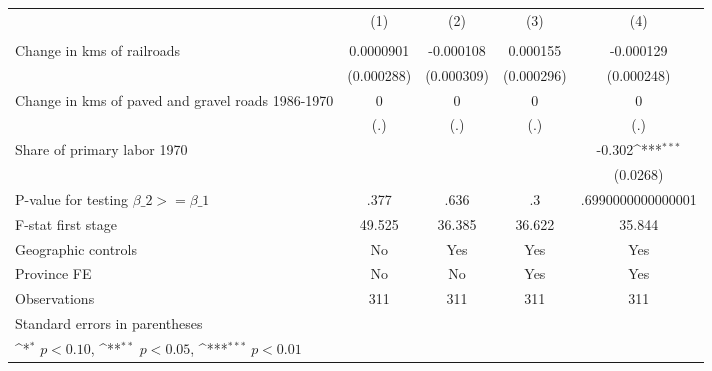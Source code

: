 {
\def\sym#1{\ifmmode^{#1}\else\(^{#1}\)\fi}
\begin{tabular}{l*{4}{c}}
\hline\hline
                &\multicolumn{1}{c}{(1)}&\multicolumn{1}{c}{(2)}&\multicolumn{1}{c}{(3)}&\multicolumn{1}{c}{(4)}\\
                &\multicolumn{1}{c}{}&\multicolumn{1}{c}{}&\multicolumn{1}{c}{}&\multicolumn{1}{c}{}\\
\hline
Change in kms of railroads&0.0000901         &-0.000108         & 0.000155         &-0.000129         \\
                &(0.000288)         &(0.000309)         &(0.000296)         &(0.000248)         \\
[1em]
Change in kms of paved and gravel roads 1986-1970&        0         &        0         &        0         &        0         \\
                &      (.)         &      (.)         &      (.)         &      (.)         \\
[1em]
Share of primary labor 1970&                  &                  &                  &   -0.302\sym{***}\\
                &                  &                  &                  & (0.0268)         \\
\hline
P-value for testing $\beta\_{2} >= \beta\_{1}$&     .377         &     .636         &       .3         &.6990000000000001         \\
F-stat first stage&   49.525         &   36.385         &   36.622         &   35.844         \\
Geographic controls&       No         &      Yes         &      Yes         &      Yes         \\
Province FE     &       No         &       No         &      Yes         &      Yes         \\
Observations    &      311         &      311         &      311         &      311         \\
\hline\hline
\multicolumn{5}{l}{\footnotesize Standard errors in parentheses}\\
\multicolumn{5}{l}{\footnotesize \sym{*} \(p<0.10\), \sym{**} \(p<0.05\), \sym{***} \(p<0.01\)}\\
\end{tabular}
}
